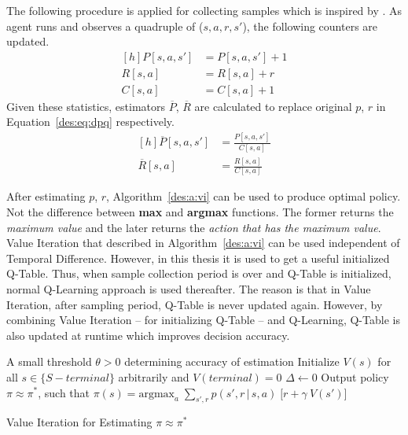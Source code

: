 The following procedure is applied for collecting samples which is inspired by \textcite{dutreilh:hal-01122123}. As agent runs and observes a quadruple of ($s,a,r,s'$), the following counters are updated.
\begin{equation}
\begin{aligned}[h]
P[s,a,s'] &= P[s,a,s'] + 1\\
R[s,a] &= R[s,a] + r \\
C[s,a] &= C[s,a] + 1
\end{aligned}
\end{equation}
Given these statistics, estimators $\overline{P}$, $\overline{R}$ are calculated to replace original $p$, $r$ in Equation~\ref{des:eq:dpq} respectively.
\begin{equation}
\begin{aligned}[h]
\overline{P}[s,a,s'] &= \frac{P[s,a,s']}{C[s,a]} \\
\overline{R}[s,a] &= \frac{R[s,a]}{C[s,a]}
\end{aligned}
\end{equation}

After estimating $p$, $r$, Algorithm~\ref{des:a:vi} can be used to produce optimal policy. Not the difference between \textbf{max} and \textbf{argmax} functions. The former returns the \emph{maximum value} and the later returns the \emph{action that has the maximum value}. Value Iteration that described in Algorithm~\ref{des:a:vi} can be used independent of Temporal Difference. However, in this thesis it is used to get a useful initialized Q-Table. Thus, when sample collection period is over and Q-Table is initialized, normal Q-Learning approach is used thereafter. The reason is that in Value Iteration, after sampling period, Q-Table is never updated again. However, by combining Value Iteration -- for initializing Q-Table -- and Q-Learning, Q-Table is also updated at runtime which improves decision accuracy.
\begin{algorithm}[h]
	\DontPrintSemicolon
	A small threshold $\theta > 0$ determining accuracy of estimation\;
	Initialize $V(s)$ for all $s \in \{S - terminal\}$ arbitrarily and $V(terminal) = 0$\;
	\BlankLine
	\Repeat{$\Delta < \theta$} {
		$\Delta \gets 0$\;
		\BlankLine
		Output policy $\pi \approx \pi^*$, such that\;
		$\pi(s) = \text{argmax}_a\;\sum_{s',r} p(s',r\,|\,s,a)\;\Big[r + \gamma\:V(s')\Big]$
	}
	\caption[Value Iteration for Estimating $\pi \approx \pi^*$]{Value Iteration for Estimating $\pi \approx \pi^*$\footnotemark}
	\label{des:a:vi}
\end{algorithm}
